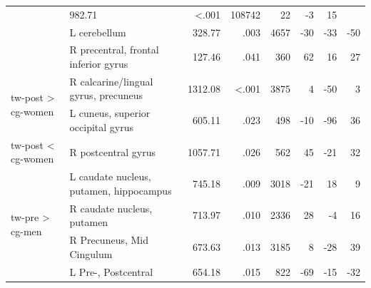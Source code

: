 \documentclass{article}
\begin{document}
\begin{table}
\begin{tabular}{l|lrrrrrr}
            & \multirow{2}{*}{982.71}
            & \multirow{2}{*}{<.001}
            & \multirow{2}{*}{108742}
            & \multirow{2}{*}{22}
            & \multirow{2}{*}{-3}
            & \multirow{2}{*}{15}
            \\
            & L + R lingual gyrus \\
            & L cerebellum                            & 328.77                   & .003                   & 4657                    & -30                 & -33                  & -50                  \\
            & R precentral, frontal inferior gyrus    & 127.46                   & .041                   & 360                     & 62                  & 16                   & 27                   \\ \hline
            \multirow{2}{*}{\ac{tw}-post > \ac{cg}-women} & R calcarine/lingual gyrus, precuneus
            & 1312.08
            & <.001
            & 3875
            & 4
            & -50
            & 3
            \\
            & L cuneus, superior occipital gyrus      & 605.11                   & .023                   & 498                     & -10                 & -96                  & 36                   \\
            \ac{tw}-post < \ac{cg}-women                  & R postcentral gyrus                     & 1057.71                  & .026                   & 562                     & 45                  & -21                  & 32                   \\ \hline
            \multirow{6}{*}{\ac{tw}-pre > \ac{cg}-men}    & L caudate nucleus, putamen, hippocampus
            & 745.18
            & .009
            & 3018
            & -21
            & 18
            & 9
            \\
            & R caudate nucleus, putamen              & 713.97                   & .010                   & 2336                    & 28                  & -4                   & 16                   \\
            & R Precuneus, Mid Cingulum               & 673.63                   & .013                   & 3185                    & 8                   & -28                  & 39                   \\
            & L Pre-, Postcentral                     & 654.18                   & .015                   & 822                     & -69                 & -15                  & -32                  \\

\end{tabular}
\end{table}
\end{document}
